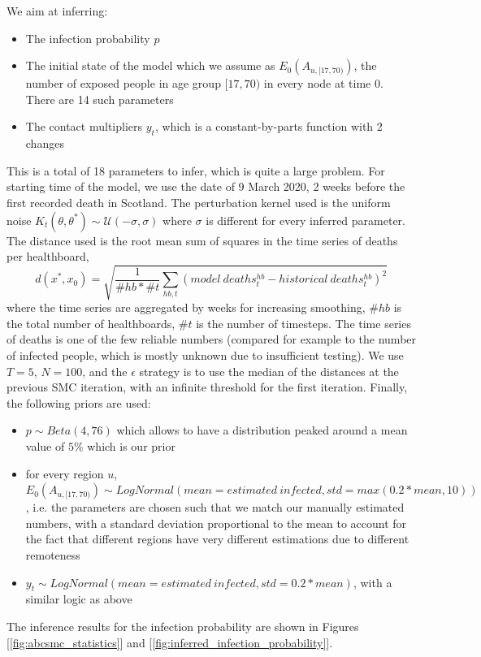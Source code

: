\documentclass[11pt]{article}
\begin{document}
We aim at inferring:
\begin{itemize}
\item The infection probability $p$
\item The initial state of the model which we assume as $E_0(A_{u,[17, 70)})$, the number of exposed people in age group $[17,70)$ in every node at time 0. There are 14 such parameters
\item The contact multipliers $y_t$, which is a constant-by-parts function with 2 changes
\end{itemize}

This is a total of 18 parameters to infer, which is quite a large problem. For starting time of the model, we use the date of 9 March 2020, 2 weeks before the first recorded death in Scotland. The perturbation kernel used is the uniform noise $K_t(\theta, \theta^*) \sim \mathcal{U}(-\sigma, \sigma)$ where $\sigma$ is different for every inferred parameter. The distance used is the root mean sum of squares in the time series of deaths per healthboard, $$d(x^*, x_0)=\sqrt{\frac{1}{\#hb * \#t}\sum_{hb, t} (model \ deaths^{hb}_t - historical \ deaths^{hb}_t)^2}$$ where the time series are aggregated by weeks for increasing smoothing, $\#hb$ is the total number of healthboards, $\#t$ is the number of timesteps. The time series of deaths is one of the few reliable numbers (compared for example to the number of infected people, which is mostly unknown due to insufficient testing). We use $T=5$, $N=100$, and the $\epsilon$ strategy is to use the median of the distances at the previous SMC iteration, with an infinite threshold for the first iteration. Finally, the following priors are used:

\begin{itemize}
\item $p \sim Beta(4, 76)$ which allows to have a distribution peaked around a mean value of $5\%$ which is our prior
\item for every region $u$, $E_0(A_{u,[17, 70)}) \sim LogNormal(mean=estimated \ infected, std=max(0.2 * mean, 10))$, i.e. the parameters are chosen such that we match our manually estimated numbers, with a standard deviation proportional to the mean to account for the fact that different regions have very different estimations due to different remoteness
\item $y_t \sim LogNormal(mean=estimated \ infected, std=0.2 * mean)$, with a similar logic as above
\end{itemize}

The inference results for the infection probability are shown in Figures [\ref{fig:abcsmc_statistics}] and [\ref{fig:inferred_infection_probability}].
\end{document}
